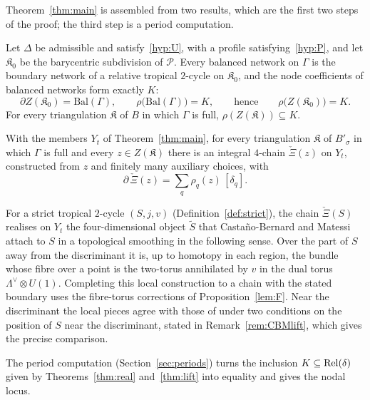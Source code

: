 Theorem~\ref{thm:main} is assembled from two results, which are the first two steps of the proof; the third step is
a period computation.

\begin{mainthm}\label{thm:real}
Let $\Delta$ be admissible and satisfy~\ref{hyp:U}, with a profile satisfying~\ref{hyp:P}, and let $\mathfrak K_0$ be the barycentric subdivision
of $\mathscr P$. Every balanced network on $\Gamma$ is the boundary network of a relative tropical $2$-cycle on
$\mathfrak K_0$, and the node coefficients of balanced networks form exactly $K$:
\[
\partial Z(\mathfrak K_0)=\mathrm{Bal}(\Gamma),\qquad \rho\bigl(\mathrm{Bal}(\Gamma)\bigr)=K,\qquad\text{hence}\qquad \rho\bigl(Z(\mathfrak K_0)\bigr)=K.
\]
For every triangulation $\mathfrak K$ of $B$ in which $\Gamma$ is full, $\rho(Z(\mathfrak K))\subseteq K$.
\end{mainthm}

\begin{mainthm}\label{thm:lift}
With the members $Y_t$ of Theorem~\ref{thm:main}, for every triangulation $\mathfrak K$ of $B'_\sigma$ in which
$\Gamma$ is full and every $z\in Z(\mathfrak K)$ there is an integral $4$-chain $\check\Xi(z)$ on $Y_t$, constructed from
$z$ and finitely many auxiliary choices, with
\[
\partial\,\check\Xi(z)=\sum_q\rho_q(z)\,[\delta_q].
\]
\end{mainthm}

\begin{remark}\label{rem:strict-statement}
For a strict tropical $2$-cycle $(S,j,v)$ (Definition~\ref{def:strict}), the chain $\check\Xi(S)$ realises on $Y_t$ the
four-dimensional object $\widetilde S$ that Casta\~no-Bernard and Matessi attach to $S$ in a topological smoothing
\cite[\S7]{CBM} in the following sense. Over the part of $S$ away from the discriminant
it is, up to homotopy in each region, the bundle whose fibre over a point is the two-torus annihilated by $v$ in the dual
torus $\Lambda^\vee\otimes U(1)$. Completing this local construction to a chain with the stated boundary uses
the fibre-torus corrections of Proposition~\ref{lem:F}. Near the discriminant the local pieces agree with those of
\cite{CBM} under two conditions on the position of $S$ near the discriminant, stated in Remark~\ref{rem:CBMlift}, which
gives the precise comparison.
\end{remark}

The period computation (Section~\ref{sec:periods}) turns the inclusion $K\subseteq\operatorname{Rel}(\delta)$ given by
Theorems~\ref{thm:real} and~\ref{thm:lift} into equality and gives the nodal locus.

